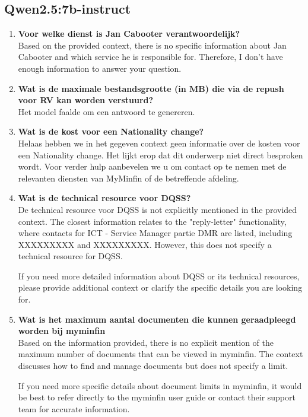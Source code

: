\subsection{Qwen2.5:7b-instruct}
\begin{enumerate}
    \item \textbf{Voor welke dienst is Jan Cabooter verantwoordelijk?}\\
    Based on the provided context, there is no specific information about Jan Cabooter and which service he is responsible for. Therefore, I don't have enough information to answer your question.
    \item \textbf{Wat is de maximale bestandsgrootte (in MB) die via de repush voor RV kan worden verstuurd?}\\
    Het model faalde om een antwoord te genereren.
    \item \textbf{Wat is de kost voor een Nationality change?}\\
    Helaas hebben we in het gegeven context geen informatie over de kosten voor een Nationality change. Het lijkt erop dat dit onderwerp niet direct besproken wordt. Voor verder hulp aanbevelen we u om contact op te nemen met de relevanten diensten van MyMinfin of de betreffende afdeling.
    \item \textbf{Wat is de technical resource voor DQSS?}\\
    De technical resource voor DQSS is not explicitly mentioned in the provided context. The closest information relates to the "reply-letter" functionality, where contacts for ICT - Service Manager partie DMR are listed, including XXXXXXXXX and XXXXXXXXX. However, this does not specify a technical resource for DQSS.
    
    If you need more detailed information about DQSS or its technical resources, please provide additional context or clarify the specific details you are looking for.
    
    \item \textbf{Wat is het maximum aantal documenten die kunnen geraadpleegd worden bij myminfin}\\
    Based on the information provided, there is no explicit mention of the maximum number of documents that can be viewed in myminfin. The context discusses how to find and manage documents but does not specify a limit.
    
    If you need more specific details about document limits in myminfin, it would be best to refer directly to the myminfin user guide or contact their support team for accurate information.
    
\end{enumerate}


